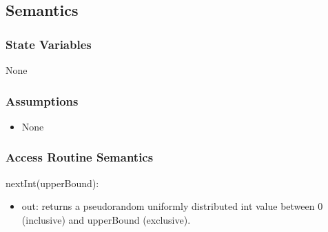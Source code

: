 \documentclass{article}
\begin{document}
\subsection*{Semantics}
\subsubsection*{State Variables}
None
\subsubsection*{Assumptions}
\begin{itemize}
    \item None
\end{itemize}

\subsubsection*{Access Routine Semantics}

nextInt(upperBound):
\begin{itemize}
    \item out: returns a pseudorandom uniformly distributed int value between 0 (inclusive) and upperBound (exclusive).
\end{itemize}

\newpage
\end{document}
